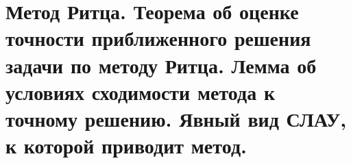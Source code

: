 \documentclass[__main__.tex]{subfiles}
\begin{document}
\section{Метод Ритца. Теорема об оценке точности приближенного решения задачи по методу Ритца. Лемма об условиях сходимости метода к точному решению. Явный вид СЛАУ, к которой приводит метод.}
\end{document}
